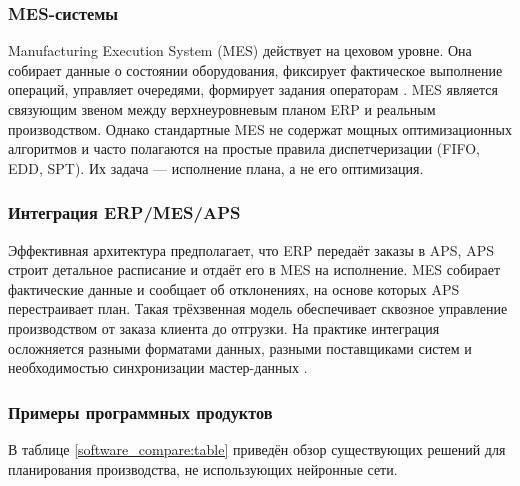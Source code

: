 \subsubsection{MES-системы}

Manufacturing Execution System (MES) действует на цеховом уровне. Она собирает данные о состоянии оборудования, фиксирует фактическое выполнение операций, управляет очередями, формирует задания операторам \cite{machinostroy}. MES является связующим звеном между верхнеуровневым планом ERP и реальным производством. Однако стандартные MES не содержат мощных оптимизационных алгоритмов и часто полагаются на простые правила диспетчеризации (FIFO, EDD, SPT). Их задача — исполнение плана, а не его оптимизация.

\subsubsection{Интеграция ERP/MES/APS}

Эффективная архитектура предполагает, что ERP передаёт заказы в APS, APS строит детальное расписание и отдаёт его в MES на исполнение. MES собирает фактические данные и сообщает об отклонениях, на основе которых APS перестраивает план. Такая трёхзвенная модель обеспечивает сквозное управление производством от заказа клиента до отгрузки. На практике интеграция осложняется разными форматами данных, разными поставщиками систем и необходимостью синхронизации мастер-данных \cite{machinostroy}.

\subsubsection{Примеры программных продуктов}

В таблице \ref{software_compare:table} приведён обзор существующих решений для планирования производства, не использующих нейронные сети.

